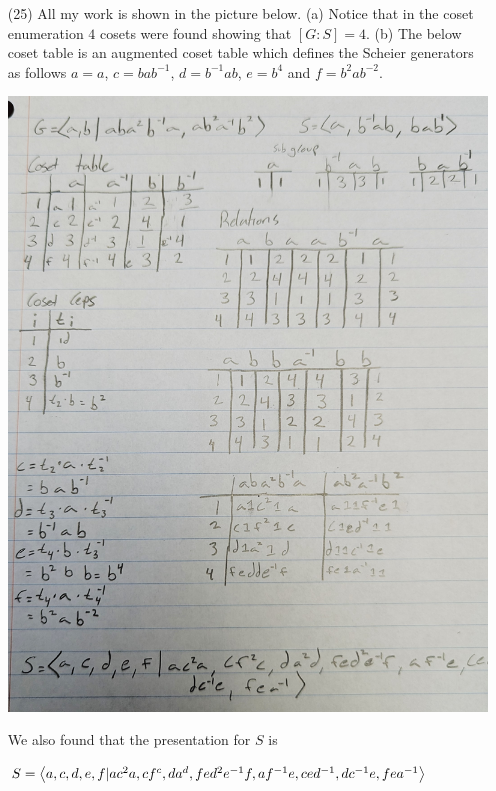 \documentclass[12pt]{amsart}
\begin{document}
\begin{itemize}
\item[(25)] All my work is shown in the picture below. (a) Notice that in the 
coset enumeration $4$ cosets were found showing that $[G:S]=4$. 
(b) The below coset table is an augmented coset table which 
defines the Scheier generators as follows $a=a$, $c=bab^{-1}$, 
$d=b^{-1}ab$, $e=b^4$ and $f=b^2ab^{-2}$.

\includegraphics[scale=.2]{676hw425.jpg}

We also found that the presentation for $S$ is 

$S=\left\langle a,c,d,e,f|ac^2a,cf^c,da^d,fed^2e^{-1}f,af^{-1}e,ced^{-1},dc^{-1}e,fea^{-1} \right\rangle$

\end{itemize}
\end{document}
